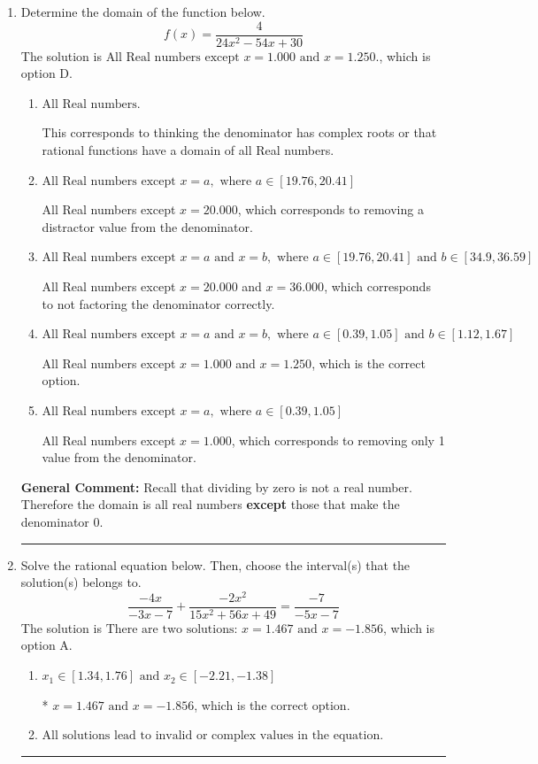 \documentclass{extbook}[14pt]
\newcommand{\litem}[1]{\item #1

\rule{\textwidth}{0.4pt}}
\begin{document}
\begin{enumerate}\litem{
Determine the domain of the function below.
\[ f(x) = \frac{4}{24x^{2} -54 x + 30} \]
The solution is \( \text{All Real numbers except } x = 1.000 \text{ and } x = 1.250. \), which is option D.\begin{enumerate}[label=\Alph*.]
\item \( \text{All Real numbers.} \)

This corresponds to thinking the denominator has complex roots or that rational functions have a domain of all Real numbers.
\item \( \text{All Real numbers except } x = a, \text{ where } a \in [19.76, 20.41] \)

All Real numbers except $x = 20.000$, which corresponds to removing a distractor value from the denominator.
\item \( \text{All Real numbers except } x = a \text{ and } x = b, \text{ where } a \in [19.76, 20.41] \text{ and } b \in [34.9, 36.59] \)

All Real numbers except $x = 20.000$ and $x = 36.000$, which corresponds to not factoring the denominator correctly.
\item \( \text{All Real numbers except } x = a \text{ and } x = b, \text{ where } a \in [0.39, 1.05] \text{ and } b \in [1.12, 1.67] \)

All Real numbers except $x = 1.000$ and $x = 1.250$, which is the correct option.
\item \( \text{All Real numbers except } x = a, \text{ where } a \in [0.39, 1.05] \)

All Real numbers except $x = 1.000$, which corresponds to removing only 1 value from the denominator.
\end{enumerate}

\textbf{General Comment:} Recall that dividing by zero is not a real number. Therefore the domain is all real numbers \textbf{except} those that make the denominator 0.
}
\litem{
Solve the rational equation below. Then, choose the interval(s) that the solution(s) belongs to.
\[ \frac{-4x}{-3x -7} + \frac{-2x^{2}}{15x^{2} +56 x + 49} = \frac{-7}{-5x -7} \]
The solution is \( \text{There are two solutions: } x = 1.467 \text{ and } x = -1.856 \), which is option A.\begin{enumerate}[label=\Alph*.]
\item \( x_1 \in [1.34, 1.76] \text{ and } x_2 \in [-2.21,-1.38] \)

* $x = 1.467 \text{ and } x = -1.856$, which is the correct option.
\item \( \text{All solutions lead to invalid or complex values in the equation.} \)



\end{enumerate}}
\end{enumerate}
\end{document}
